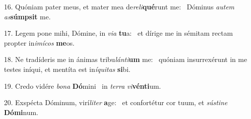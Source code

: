 16. Quóniam pater meus, et mater mea de\textit{re}\textit{li}\textbf{qué}runt me: \ast\  Dóminus \textit{au}\textit{tem} \textit{as}\textbf{súmp}\textbf{sit} me.\

17. Legem pone mihi, Dómine, in \textit{vi}\textit{a} \textbf{tu}a: \ast\  et dírige me in sémitam rectam propter in\textit{i}\textit{mí}\textit{cos} \textbf{me}os.\

18. Ne tradíderis me in ánimas tribu\textit{lán}\textit{ti}\textbf{um} me: \ast\  quóniam insurrexérunt in me testes iníqui, et mentíta est in\textit{í}\textit{qui}\textit{tas} \textbf{si}bi.\

19. Credo vidére \textit{bo}\textit{na} \textbf{Dó}mini \ast\  in \textit{ter}\textit{ra} \textit{vi}\textbf{vén}\textbf{ti}um.\

20. Exspécta Dóminum, virí\textit{li}\textit{ter} \textbf{a}ge: \ast\  et confortétur cor tuum, et \textit{sús}\textit{ti}\textit{ne} \textbf{Dó}\textbf{mi}num.\

